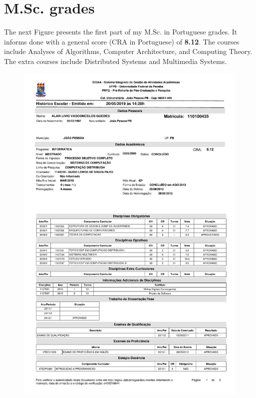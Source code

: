 \documentclass[10pt,a4paper,sans,colorlinks]{moderncv}
\begin{document}
\section{M.Sc. grades}
The next Figure presents the first part of my M.Sc. in Portuguese grades.
It informs done with a general score (CRA in Portuguese) of \textbf{8.12}.
The courses include Analyses of Algorithms, Computer Architecture, and Computing Theory.
The extra courses include Distributed Systems and Multimedia Systems.
\vspace{1em}
\begin{figure}
    \centering
    \includegraphics[align=t,width=\textwidth,height=0.75\textheight, keepaspectratio=true, trim=0cm 0cm 0cm 2cm]{certificates/msc-grades.pdf}
\end{figure}
\end{document}

